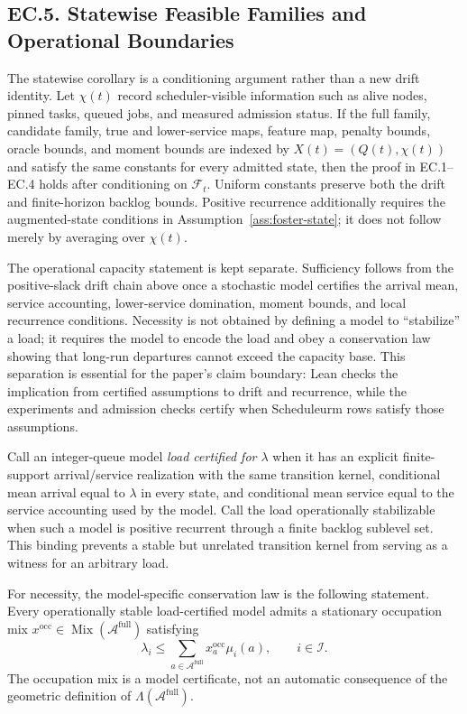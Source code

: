 \documentclass[opre,dblanonrev]{informs4}
\newcommand{\Afull}{\mathcal A^{\mathrm{full}}}
\begin{document}
\subsection*{EC.5. Statewise Feasible Families and Operational Boundaries}

The statewise corollary is a conditioning argument rather than a new drift
identity.  Let \(\chi(t)\) record scheduler-visible information such as alive
nodes, pinned tasks, queued jobs, and measured admission status.  If the full
family, candidate family, true and lower-service maps, feature map, penalty
bounds, oracle bounds, and moment bounds are indexed by
\(X(t)=(Q(t),\chi(t))\) and satisfy the same constants for every admitted state,
then the proof in EC.1--EC.4 holds after conditioning on \(\mathcal F_t\).
Uniform constants preserve both the drift and finite-horizon backlog bounds.
Positive recurrence additionally requires the augmented-state conditions in
Assumption~\ref{ass:foster-state}; it does not follow merely by averaging over
\(\chi(t)\).

The operational capacity statement is kept separate.  Sufficiency follows from
the positive-slack drift chain above once a stochastic model certifies the
arrival mean, service accounting, lower-service domination, moment bounds, and
local recurrence conditions.  Necessity is not obtained by defining a model to
``stabilize'' a load; it requires the model to encode the load and obey a
conservation law showing that long-run departures cannot exceed the capacity
base.  This separation is essential for the paper's claim boundary: Lean checks
the implication from certified assumptions to drift and recurrence, while the
experiments and admission checks certify when Scheduleurm rows satisfy those
assumptions.

Call an integer-queue model \emph{load certified for \(\lambda\)} when it has an
explicit finite-support arrival/service realization with the same transition
kernel, conditional mean arrival equal to \(\lambda\) in every state, and
conditional mean service equal to the service accounting used by the model.
Call the load operationally stabilizable when such a model is positive recurrent
through a finite backlog sublevel set.  This binding prevents a stable but
unrelated transition kernel from serving as a witness for an arbitrary load.

For necessity, the model-specific conservation law is the following statement.
Every operationally stable load-certified model admits a stationary occupation
mix \(x^{\mathrm{occ}}\in\operatorname{Mix}(\Afull)\) satisfying
\begin{equation}
  \lambda_i
  \le
  \sum_{a\in\Afull}x^{\mathrm{occ}}_a\mu_i(a),
  \qquad i\in\mathcal I.
  \label{eq:ec-operational-conservation}
\end{equation}
The occupation mix is a model certificate, not an automatic consequence of
the geometric definition of \(\Lambda(\Afull)\).
\end{document}
